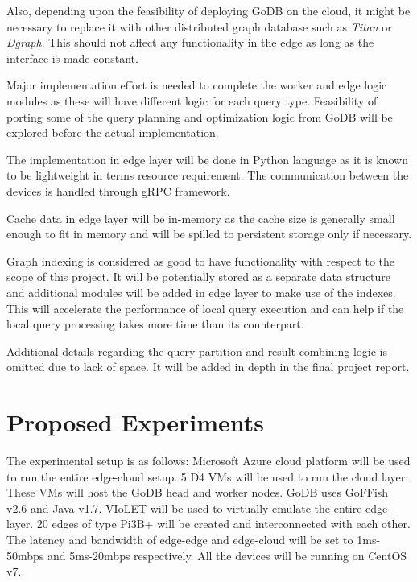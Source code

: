 \documentclass[conference]{IEEEtran}
\begin{document}
Also, depending upon the feasibility of deploying GoDB on the cloud, it might be necessary to replace it with other distributed graph database such as \emph{Titan}\cite{titan} or \emph{Dgraph}\cite{dgraph}. This should not affect any functionality in the edge as long as the interface is made constant.

Major implementation effort is needed to complete the worker and edge logic modules as these will have different logic for each query type. Feasibility of porting some of the query planning and optimization logic from GoDB will be explored before the actual implementation.

The implementation in edge layer will be done in Python language as it is known to be lightweight in terms resource requirement. The communication between the devices is handled through gRPC framework.

Cache data in edge layer will be in-memory as the cache size is generally small enough to fit in memory and will be spilled to persistent storage only if necessary.

Graph indexing is considered as good to have functionality with respect to the scope of this project. It will be potentially stored as a separate data structure and additional modules will be added in edge layer to make use of the indexes. This will accelerate the performance of local query execution and can help if the local query processing takes more time than its counterpart.



Additional details regarding the query partition and result combining logic is omitted due to lack of space. It will be added in depth in the final project report.

\section{Proposed Experiments}

The experimental setup is as follows: Microsoft Azure cloud platform will be used to run the entire edge-cloud setup. 5 D4 VMs will be used to run the cloud layer. These VMs will host the GoDB head and worker nodes. GoDB uses GoFFish v2.6 and Java v1.7. VIoLET\cite{DBLP:journals/corr/abs-1806-06032} will be used to virtually emulate the entire edge layer. 20 edges of type Pi3B+ will be created and interconnected with each other. The latency and bandwidth of edge-edge and edge-cloud will be set to 1ms-50mbps and 5ms-20mbps respectively. All the devices will be running on CentOS v7.
\end{document}

